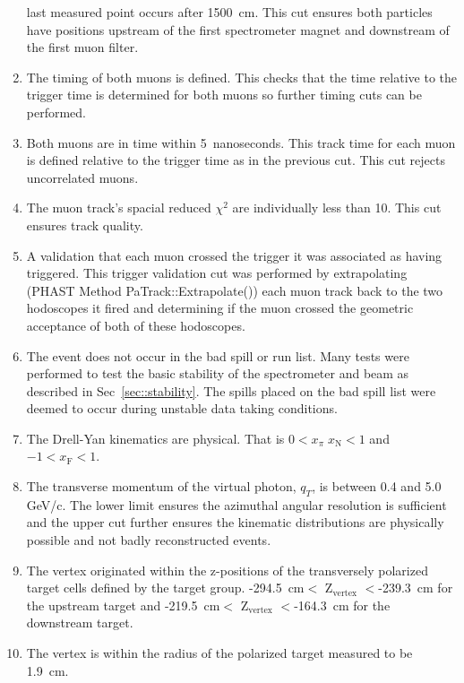 \begin{enumerate}
  last measured point occurs after 1500~cm.  This cut ensures both particles
  have positions upstream of the first spectrometer magnet and downstream of the
  first muon filter.
\item The timing of both muons is defined.  This checks that the time relative
  to the trigger time is determined for both muons so further timing cuts can be
  performed.
\item Both muons are in time within 5~nanoseconds.  This track time for each
  muon is defined relative to the trigger time as in the previous cut.  This cut
  rejects uncorrelated muons.
\item The muon track's spacial reduced $\chi^2$ are individually less than 10.
  This cut ensures track quality.
\item A validation that each muon crossed the trigger it was associated as
  having triggered.  This trigger validation cut was performed by extrapolating
  (PHAST Method PaTrack::Extrapolate()) each muon track back to the two
  hodoscopes it fired and determining if the muon crossed the geometric
  acceptance of both of these hodoscopes.
\item The event does not occur in the bad spill or run list.  Many tests were
  performed to test the basic stability of the spectrometer and beam as
  described in Sec~\ref{sec::stability}.  The spills placed on the bad spill
  list were deemed to occur during unstable data taking conditions.
\item The Drell-Yan kinematics are physical.  That is $0 < x_{\pi} \;
  x_{\mathrm{N}} < 1$ and $-1 < x_{\mathrm{F}} < 1$.
\item The transverse momentum of the virtual photon, $q_T$, is between 0.4 and
  5.0 GeV/c.  The lower limit ensures the azimuthal angular resolution is
  sufficient and the upper cut further ensures the kinematic distributions are
  physically possible and not badly reconstructed events.
\item The vertex originated within the z-positions of the transversely polarized
  target cells defined by the target group.  -294.5~cm$<$ Z$_{\mathrm{vertex}}$
  $<$-239.3~cm for the upstream target and -219.5~cm$<$ Z$_{\mathrm{vertex}}$
  $<$-164.3~cm for the downstream target.
\item The vertex is within the radius of the polarized target measured to be
  1.9~cm.
\end{enumerate}

